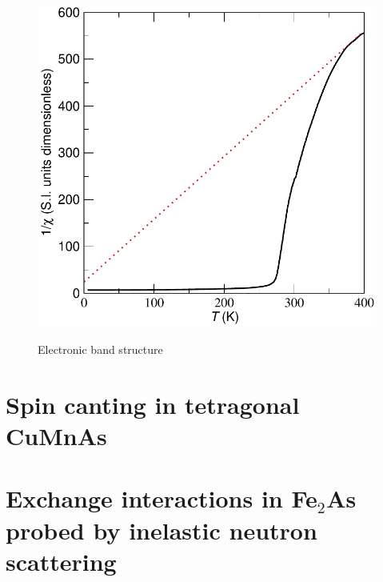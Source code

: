 \documentclass[11pt,edeposit,draftthesis]{uiucthesis2020}
\begin{document}
\begin{mainmatter}
\begin{figure}
\centering\includegraphics[width=\columnwidth]{figures/ch6/FC_52A_inverse_cropped.pdf} \\
\caption{\label{fig:inv_susceptibility}
Electronic band structure
}
\end{figure}

\Blindtext[6]

\chapter{Spin canting in tetragonal CuMnAs}

\Blindtext[6]

\chapter{Exchange interactions in Fe$_2$As probed by inelastic neutron scattering}


\end{mainmatter}
\end{document}

